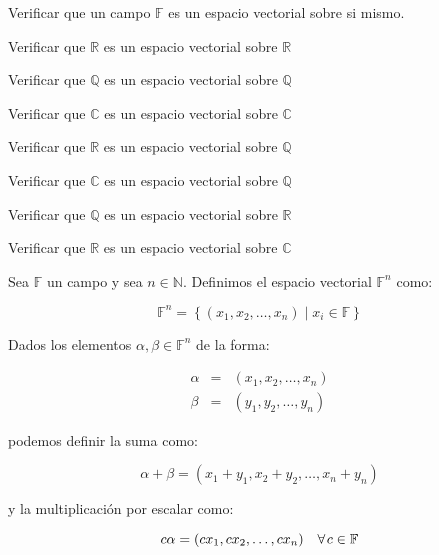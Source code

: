 		\begin{ejercicio}
			Verificar que un campo $\mathbb{F}$ es un espacio vectorial sobre si mismo.
		\end{ejercicio}

		\begin{ejercicio}
			Verificar que $\mathbb{R}$ es un espacio vectorial sobre $\mathbb{R}$
		\end{ejercicio}

		\begin{ejercicio}
			Verificar que $\mathbb{Q}$ es un espacio vectorial sobre $\mathbb{Q}$
		\end{ejercicio}

		\begin{ejercicio}
			Verificar que $\mathbb{C}$ es un espacio vectorial sobre $\mathbb{C}$
		\end{ejercicio}

		\begin{ejercicio}
			Verificar que $\mathbb{R}$ es un espacio vectorial sobre $\mathbb{Q}$
		\end{ejercicio}

		\begin{ejercicio}
			Verificar que $\mathbb{C}$ es un espacio vectorial sobre $\mathbb{Q}$
		\end{ejercicio}

		\begin{ejercicio}
			Verificar que $\mathbb{Q}$ es un espacio vectorial sobre $\mathbb{R}$
		\end{ejercicio}

		\begin{ejercicio}
			Verificar que $\mathbb{R}$ es un espacio vectorial sobre $\mathbb{C}$
		\end{ejercicio}

		\begin{definicion}
			Sea $\mathbb{F}$ un campo y sea $n \in \mathbb{N}$.
			Definimos el espacio vectorial $\mathbb{F}^n$ como:

			\begin{equation}
				\mathbb{F}^n = \left\{ (x_1, x_2, \dots, x_n) \mid x_i \in \mathbb{F} \right\}
			\end{equation}

			Dados los elementos $\alpha, \beta \in \mathbb{F}^n$ de la forma:

			\begin{eqnarray*}
				\alpha & = & (x_1, x_2, \dots, x_n) \\
				\beta  & = & (y_1, y_2, \dots, y_n)
			\end{eqnarray*}

			podemos definir la suma como:

			\begin{equation}
				\alpha + \beta = (x_1 + y_1, x_2 + y_2, \dots, x_n + y_n)
			\end{equation}

			y la multiplicación por escalar como:

			\begin{equation}
				c \alpha = (c x_1, c x_2, \dots, c x_n) \quad \forall \mkern2mu c \in \mathbb{F}
			\end{equation}
		\end{definicion}

